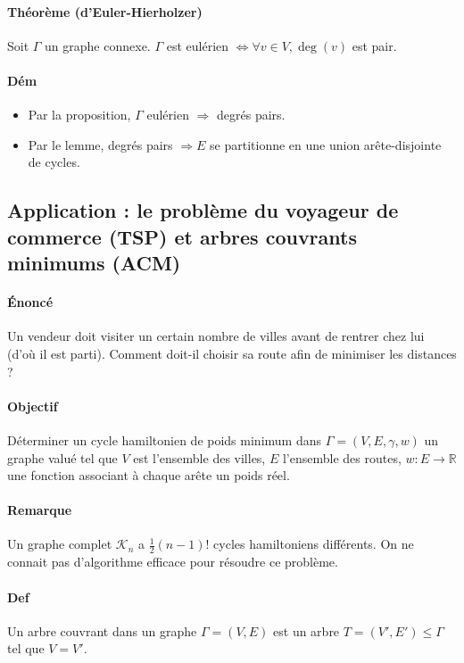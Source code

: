 \documentclass{article}
\newenvironment{lst}
	{\begin{minipage}[t]{.9\linewidth}\begin{itemize}}
	{\end{itemize}\end{minipage}}
\begin{document}
			\paragraph{Théorème (d'Euler-Hierholzer)} Soit $\Gamma$ un graphe connexe. $\Gamma$ est eulérien $\iff \forall v \in V, \deg(v)$ est pair.

			\paragraph{Dém}
				\begin{lst}
					\item Par la proposition, $\Gamma$ eulérien $\Rightarrow$ degrés pairs.
					\item Par le lemme, degrés pairs $\Rightarrow E$ se partitionne en une union arête-disjointe de cycles.
				\end{lst}

		\subsection{Application : le problème du voyageur de commerce (TSP) et arbres couvrants minimums (ACM)}
			\paragraph{Énoncé} Un vendeur doit visiter un certain nombre de villes avant de rentrer chez lui (d'où il est parti).
			Comment doit-il choisir sa route afin de minimiser les distances ?

			\paragraph{Objectif} Déterminer un cycle hamiltonien de poids minimum dans $\Gamma = (V, E, \gamma, w)$ un graphe valué tel que $V$ est
			l'ensemble des villes, $E$ l'ensemble des routes, $w : E \to \mathbb R$ une fonction associant à chaque arête un poids réel.

			\paragraph{Remarque} Un graphe complet $\mathcal K_n$ a $\frac 12(n-1)!$ cycles hamiltoniens différents. On ne connait pas d'algorithme
			efficace pour résoudre ce problème.

			\paragraph{Def} Un arbre couvrant dans un graphe $\Gamma = (V, E)$ est un arbre $T = (V', E') \leq \Gamma$ tel que $V = V'$.
\end{document}
